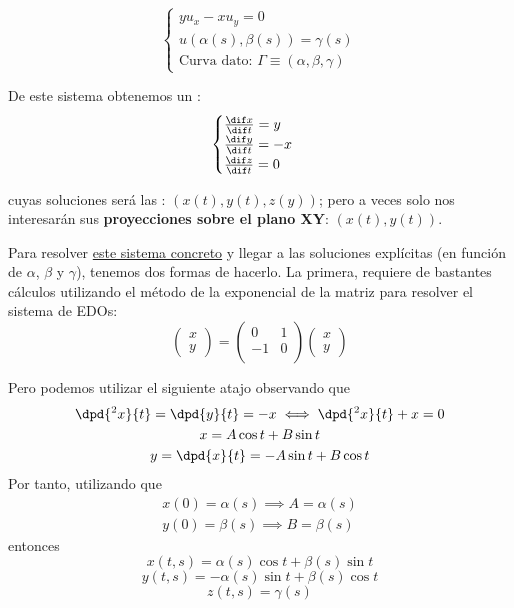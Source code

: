 	\begin{example}[2]

		\begin{equation*}
			\begin{cases}
				yu_x - x u_y = 0 \\
				u(\alpha(s),\beta(s)) = \gamma(s) \\
				\text{Curva dato: } \Gamma \equiv (\alpha, \beta, \gamma)
			\end{cases}
		\end{equation*}

		De este sistema obtenemos un :
		\begin{equation*}
			\begin{cases}
				\frac{\dif x}{\dif t} = y \\
				\frac{\dif y}{\dif t} = -x \\
				\frac{\dif z}{\dif t} = 0
			\end{cases}
		\end{equation*}

		cuyas soluciones será las :
		$(x(t),y(t),z(y))$; pero a veces solo nos interesarán sus {\bf proyecciones sobre el plano XY}: $(x(t),y(t))$.

		Para resolver \underline{este sistema concreto} y llegar a las soluciones explícitas (en función de $\alpha$, $\beta$ y $\gamma$), tenemos dos formas de hacerlo.
		La primera, requiere de bastantes cálculos utilizando el método de la exponencial de la matriz para resolver el sistema de EDOs:
		\[ \begin{pmatrix}
			x \\
			y
			\end{pmatrix} =
		\begin{pmatrix}
			 0 & 1 \\
			-1 & 0 \\
			\end{pmatrix}
			\begin{pmatrix}
			x \\
			y
			\end{pmatrix}\]

		Pero podemos utilizar el siguiente atajo observando que
		\begin{gather*}
			\dpd{^2 x}{t} = \dpd{y}{t} = -x \iff \dpd{^2 x}{t} + x = 0\\
			x = A \cos t + B \sin t\\
			y = \dpd{x}{t} = -A \sin t + B \cos t
		\end{gather*}
		Por tanto, utilizando que
		\begin{gather*}
			x(0) =\alpha(s)	\implies A = \alpha(s)\\
			y(0) = \beta(s) \implies B = \beta(s)
		\end{gather*}
		entonces
		$$x(t,s) = \alpha(s) \cos t + \beta (s) \sin t$$
		$$y(t,s) = -\alpha(s) \sin t + \beta (s) \cos t$$
		$$z(t,s) = \gamma(s)$$


\end{example}
